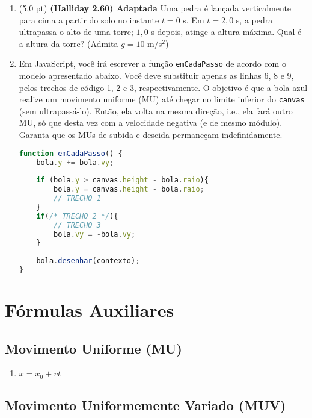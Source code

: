 \documentclass[12pt,a4paper,oneside]{article}
\begin{document}
\begin{enumerate}

	\item (5,0 pt) {\bf (Halliday 2.60) Adaptada} Uma pedra é lançada verticalmente para cima a partir do solo no instante $t = 0$ s. Em  $t  =2,0$ s, a pedra ultrapassa o alto de uma torre; $1,0$ s depois, atinge a altura máxima. Qual é a altura da torre? (Admita $g = 10$ m/s$^2$)

	\item Em JavaScript, você irá escrever a função {\tt emCadaPasso} de acordo com o modelo apresentado abaixo. Você deve substituir apenas as linhas 6, 8 e 9, pelos trechos de código 1, 2 e 3, respectivamente. O objetivo é que a bola azul realize um movimento uniforme (MU) até chegar no limite inferior do {\tt canvas} (sem ultrapassá-lo). Então, ela volta na mesma direção, i.e., ela fará outro MU, só que desta vez com a velocidade negativa (e de mesmo módulo). Garanta que os MUs de subida e descida permaneçam indefinidamente.

\begin{lstlisting}[language=JavaScript]
function emCadaPasso() {    
	bola.y += bola.vy; 
	
	if (bola.y > canvas.height - bola.raio){ 
		bola.y = canvas.height - bola.raio; 
		// TRECHO 1
	}
	if(/* TRECHO 2 */){
		// TRECHO 3
		bola.vy = -bola.vy;
	}
	
	bola.desenhar(contexto); 
}\end{lstlisting}

\end{enumerate}

\newpage
 
\section{Fórmulas Auxiliares}

\subsection{Movimento Uniforme (MU)}

\begin{enumerate}
\item $x = x_0 + vt$ 
\end{enumerate}

\subsection{Movimento Uniformemente Variado (MUV)}
\end{document}
